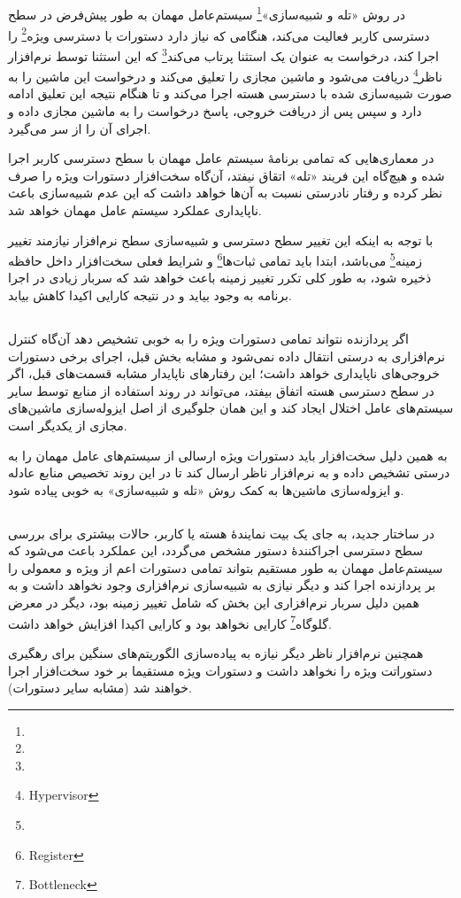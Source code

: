 \subsection{}
در روش «تله و شبیه‌سازی»\footnote{} سیستم‌عامل مهمان به طور پیش‌فرض در سطح دسترسی کاربر فعالیت می‌کند،
هنگامی که نیاز دارد دستورات با دسترسی ویژه\footnote{} را اجرا کند،
درخواست به عنوان یک استثنا پرتاب می‌کند\footnote{} که این استثنا
توسط نرم‌افزار ناظر\footnote{Hypervisor} دریافت می‌شود و ماشین مجازی را تعلیق می‌کند
و درخواست این ماشین را به صورت شبیه‌سازی شده با دسترسی هسته اجرا می‌کند و تا هنگام نتیجه این تعلیق ادامه دارد و سپس پس از
دریافت خروجی، پاسخ درخواست را به ماشین مجازی داده و اجرای آن را از سر می‌گیرد.
\par
در معماری‌هایی که تمامی برنامهٔ سیستم عامل مهمان با سطح دسترسی کاربر اجرا شده و هیچ‌گاه این فریند «تله» اتقاق نیفتد،
آن‌گاه سخت‌افزار دستورات ویژه را صرف نظر کرده و رفتار نادرستی نسبت به آن‌ها خواهد داشت که این عدم شبیه‌سازی باعث ناپایداری عملکرد سیستم‌ عامل مهمان خواهد شد.
\par
با توجه به اینکه این تغییر سطح دسترسی و شبیه‌سازی سطح نرم‌افزار نیازمند تغییر زمینه\footnote{} می‌باشد،
ابتدا باید تمامی ثبات‌ها\footnote{Register} و شرایط فعلی سخت‌افزار داخل حافظه ذخیره شود، به طور کلی تکرر تغییر زمینه باعث خواهد شد
که سربار زیادی در اجرا برنامه به وجود بیاید و در نتیجه کارایی اکیدا کاهش بیابد.

\subsection{}
اگر پردازنده نتواند تمامی دستورات ویژه را به خوبی تشخیص دهد آن‌گاه کنترل نرم‌افزاری
به درستی انتقال داده نمی‌شود و مشابه بخش قبل، اجرای برخی دستورات خروجی‌های ناپایداری خواهد داشت؛
این رفتارهای ناپایدار مشابه قسمت‌های قبل، اگر در سطح دسترسی هسته اتفاق بیفتد، می‌تواند در روند استفاده از منابع توسط سایر سیستم‌های عامل
اختلال ایجاد کند و این همان جلوگیری از اصل ایزوله‌سازی ماشین‌های مجازی از یکدیگر است.
\par
به همین دلیل سخت‌افزار باید دستورات ویژه ارسالی از سیستم‌های عامل مهمان را به درستی تشخیص داده و به نرم‌افزار ناظر ارسال کند تا در این روند
تخصیص منابع عادله و ایزوله‌سازی ماشین‌ها به کمک روش «تله و شبیه‌سازی» به خوبی پیاده شود.

\subsection{}
در ساختار جدید، به جای یک بیت نمایندهٔ هسته یا کاربر، حالات بیشتری برای بررسی سطح دسترسی اجرا‌کنندهٔ دستور مشخص می‌گردد، این 
عملکرد باعث می‌شود که سیستم‌عامل مهمان به طور مستقیم بتواند تمامی دستورات اعم از ویژه و معمولی را بر پردازنده اجرا کند و دیگر نیازی به شبیه‌سازی
نرم‌افزاری وجود نخواهد داشت و به همین دلیل سربار نرم‌افزاری این بخش که شامل تغییر زمینه بود، دیگر در معرض گلوگاه\footnote{Bottleneck} کارایی
نخواهد بود و کارایی اکیدا افزایش خواهد داشت.
\par
همچنین نرم‌افزار ناظر دیگر نیازه به پیاده‌سازی الگوریتم‌های سنگین برای رهگیری دستوراتت ویژه را نخواهد داشت و دستورات ویژه مستقیما بر خود سخت‌افزار اجرا خواهند شد (مشابه سایر دستورات).

